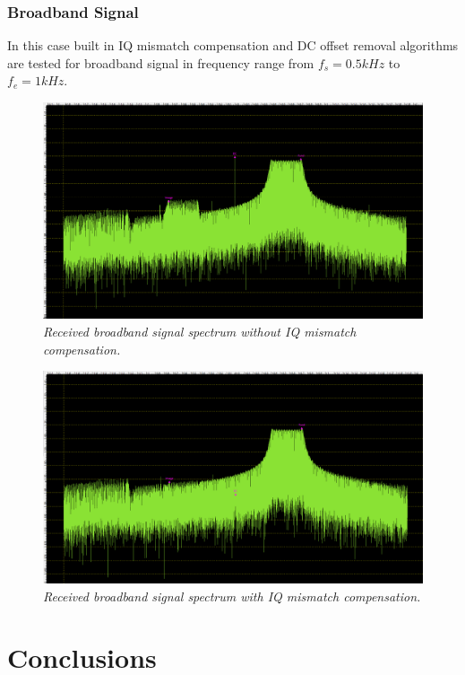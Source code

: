 \documentclass[en,printmode]{mgr}
\begin{document}
	 \subsection*{Broadband Signal}
	 	In this case built in IQ mismatch compensation and DC offset removal algorithms are
	 	tested for broadband signal in frequency range from $f_s=0.5kHz$ to $f_e=1kHz$.
   		 	\begin{figure}[H]
    			\centering
   				\includegraphics[width=\textwidth]{plots/real_band_off.png}
   		 		\caption{\textit{Received broadband signal spectrum without IQ mismatch compensation.}}
   		 	\end{figure}
   		 	\begin{figure}[H]
    			\centering
   				\includegraphics[width=\textwidth]{plots/real_band_on.png}
   		 		\caption{\textit{Received broadband signal spectrum with IQ mismatch compensation.}}
   		 	\end{figure}	 
\chapter{ Conclusions}
\end{document}
